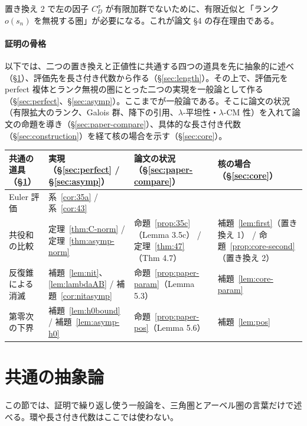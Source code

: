 \documentclass[11pt,a4paper]{ltjsarticle}
\numberwithin{equation}{section}
\theoremstyle{plain}
\theoremstyle{definition}
\theoremstyle{definition}
\begin{document}
置き換え 2 で左の因子 $C_D^\sigma$ が有限加群でないために、有限近似と「ランク $o(s_n)$ を無視する圏」が必要になる。これが論文 §4 の存在理由である。

\paragraph{証明の骨格}
以下では、二つの置き換えと正値性に共通する四つの道具を先に抽象的に述べ（§\ref{sec:abstract}）、評価先を長さ付き代数から作る（§\ref{sec:length}）。その上で、評価元を perfect 複体とランク無視の圏にとった二つの実現を一般論として作る（§\ref{sec:perfect}、§\ref{sec:asymp}）。ここまでが一般論である。そこに論文の状況（有限拡大のランク、Galois 群、降下の引用、$\lambda$-平坦性・$\lambda$-CM 性）を入れて論文の命題を導き（§\ref{sec:paper-compare}）、具体的な長さ付き代数（§\ref{sec:construction}）を経て核の場合を示す（§\ref{sec:core}）。
\begin{center}
\small
\begin{tabularx}{\textwidth}{>{\raggedright}p{2.6cm}>{\raggedright}X>{\raggedright}X>{\raggedright\arraybackslash}X}
\toprule
共通の道具（§\ref{sec:abstract}） & 実現（§\ref{sec:perfect} / §\ref{sec:asymp}） & 論文の状況（§\ref{sec:paper-compare}） & 核の場合（§\ref{sec:core}） \\
\midrule
Euler 評価 & 系~\ref{cor:35a} / 系~\ref{cor:43} & & \\
共役和の比較 & 定理~\ref{thm:C-norm} / 定理~\ref{thm:asymp-norm} & 命題~\ref{prop:35c}（Lemma 3.5c） / 定理~\ref{thm:47}（Thm 4.7） & 補題~\ref{lem:first}（置き換え 1） / 命題~\ref{prop:core-second}（置き換え 2） \\
反復錐による消滅 & 補題~\ref{lem:nit}、\ref{lem:lambdaAB} / 補題~\ref{cor:nitasymp} & 命題~\ref{prop:paper-param}（Lemma 5.3） & 補題~\ref{lem:core-param} \\
第零次の下界 & 補題~\ref{lem:h0bound} / 補題~\ref{lem:asymp-h0} & 命題~\ref{prop:paper-pos}（Lemma 5.6） & 補題~\ref{lem:pos} \\
\bottomrule
\end{tabularx}
\end{center}

\section{共通の抽象論}\label{sec:abstract}\label{sec:planB}\label{sec:planC}

この節では、証明で繰り返し使う一般論を、三角圏とアーベル圏の言葉だけで述べる。環や長さ付き代数はここでは使わない。
\end{document}
